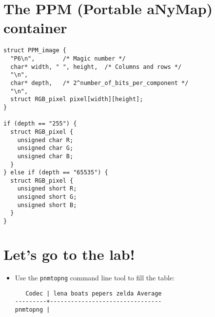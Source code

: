 \section*{The PPM (Portable aNyMap) container}

\begin{verbatim}
struct PPM_image {
  "P6\n",        /* Magic number */
  char* width, " ", height,  /* Columns and rows */
  "\n",
  char* depth,   /* 2^number_of_bits_per_component */
  "\n",
  struct RGB_pixel pixel[width][height];
}

if (depth == "255") {
  struct RGB_pixel {
    unsigned char R;
    unsigned char G;
    unsigned char B;
  }
} else if (depth == "65535") {
  struct RGB_pixel {
    unsigned short R;
    unsigned short G;
    unsigned short B;
  }
}
\end{verbatim}


\section*{Let's go to the lab!}
\begin{itemize}
\item Use the \texttt{pnmtopng} command line tool to fill the table:
\begin{verbatim}
   Codec | lena boats pepers zelda Average
---------+--------------------------------
pnmtopng | 
\end{verbatim}
\end{itemize}


